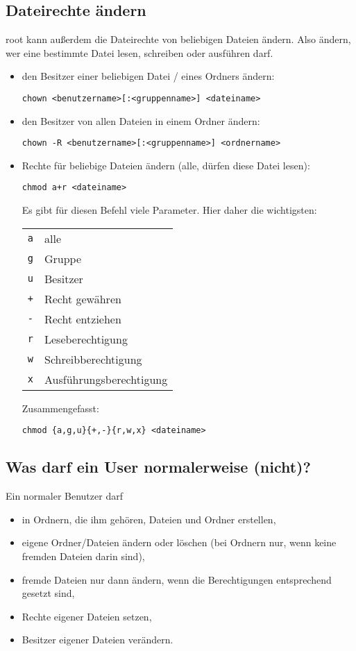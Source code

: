 \documentclass[a4paper,10pt]{article}
\newcommand{\befehl}[1]{
  \begin{center}
    \texttt{#1}
  \end{center}
}
\begin{document}
    \subsection{Dateirechte ändern}
      root kann außerdem die Dateirechte von beliebigen Dateien ändern. Also ändern, wer eine bestimmte Datei lesen, schreiben oder ausführen darf.  
      \begin{itemize}
	\item den Besitzer einer beliebigen Datei / eines Ordners ändern:
	  \befehl{chown <benutzername>[:<gruppenname>] <dateiname>}
	\item den Besitzer von allen Dateien in einem Ordner ändern:
	  \befehl{chown -R <benutzername>[:<gruppenname>] <ordnername>}
	\item Rechte für beliebige Dateien ändern (alle, dürfen diese Datei lesen):
	  \befehl{chmod a+r <dateiname>}
	  Es gibt für diesen Befehl viele Parameter. Hier daher die wichtigsten:
	  \begin{center}
	    \begin{tabular}{ll}
	      \texttt{a} & alle \\
	      \texttt{g} & Gruppe \\
	      \texttt{u} & Besitzer \\
	      \texttt{+} & Recht gewähren \\
	      \texttt{-} & Recht entziehen \\
	      \texttt{r} & Leseberechtigung \\
	      \texttt{w} & Schreibberechtigung \\
	      \texttt{x} & Ausführungsberechtigung \\
	    \end{tabular}
	  \end{center} 
	  Zusammengefasst:
	  \befehl{chmod \{a,g,u\}\{+,-\}\{r,w,x\} <dateiname>}
      \end{itemize}   

    \subsection{Was darf ein User normalerweise (nicht)?}
      Ein normaler Benutzer darf 
      \begin{itemize}
	\item in Ordnern, die ihm gehören, Dateien und Ordner erstellen,
	\item eigene Ordner/Dateien ändern oder löschen (bei Ordnern nur, wenn keine fremden Dateien darin sind),
	\item fremde Dateien nur dann ändern, wenn die Berechtigungen entsprechend gesetzt sind,
	\item Rechte eigener Dateien setzen,
	\item Besitzer eigener Dateien verändern.
      \end{itemize}
\end{document}

